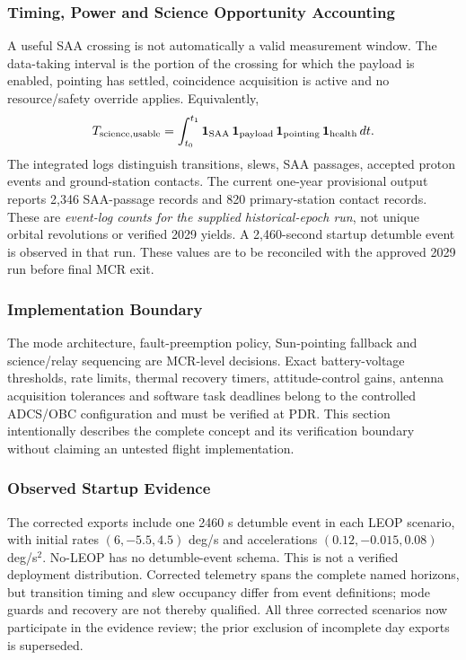 \subsubsection{Timing, Power and Science Opportunity Accounting}\label{app:op-logic-accounting}
A useful SAA crossing is not automatically a valid measurement window. The data-taking interval is the portion of the crossing for which the payload is enabled, pointing has settled, coincidence acquisition is active and no resource/safety override applies. Equivalently,
\begin{equation}
T_{\rm science,usable}=\int_{t_0}^{t_1}\mathbf{1}_{\rm SAA}\,\mathbf{1}_{\rm payload}\,\mathbf{1}_{\rm pointing}\,\mathbf{1}_{\rm health}\,dt.
\end{equation}
The integrated logs distinguish transitions, slews, SAA passages, accepted proton events and ground-station contacts. The current one-year provisional output reports 2,346 SAA-passage records and 820 primary-station contact records. These are \emph{event-log counts for the supplied historical-epoch run}, not unique orbital revolutions or verified 2029 yields. A 2,460-second startup detumble event is observed in that run. These values are to be reconciled with the approved 2029 run before final MCR exit.

\subsubsection{Implementation Boundary}\label{app:op-logic-note}
The mode architecture, fault-preemption policy, Sun-pointing fallback and science/relay sequencing are MCR-level decisions. Exact battery-voltage thresholds, rate limits, thermal recovery timers, attitude-control gains, antenna acquisition tolerances and software task deadlines belong to the controlled ADCS/OBC configuration and must be verified at PDR. This section intentionally describes the complete concept and its verification boundary without claiming an untested flight implementation.

\subsubsection{Observed Startup Evidence}\label{app:startup-evidence}
The corrected exports include one 2460 s detumble event in each LEOP scenario, with initial rates $(6,-5.5,4.5)$ deg/s and accelerations $(0.12,-0.015,0.08)$ deg/s$^2$. No-LEOP has no detumble-event schema. This is not a verified deployment distribution. Corrected telemetry spans the complete named horizons, but transition timing and slew occupancy differ from event definitions; mode guards and recovery are not thereby qualified. All three corrected scenarios now participate in the evidence review; the prior exclusion of incomplete day exports is superseded.
